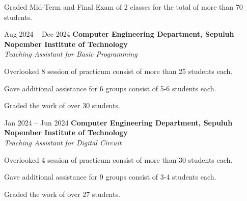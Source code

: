     \vspace{0.10 cm}
    \begin{onecolentry}
        \begin{highlights}
            \item Graded Mid-Term and Final Exam of 2 classes for the total of more than 70 students.
            \end{highlights}
    \end{onecolentry}

    \vspace{0.2 cm}

    \begin{twocolentry}{
        Aug 2024 – Dec 2024
    }
    \textbf{Computer Engineering Department, Sepuluh Nopember Institute of Technology}\\
    \textit{Teaching Assistant for Basic Programming}
    \end{twocolentry}

    \vspace{0.10 cm}
    \begin{onecolentry}
        \begin{highlights}
            \item Overlooked 8 session of practicum consist of more than 25 students each.
            \item Gave additional assistance for 6 groups consist of 5-6 students each.
            \item Graded the work of over 30 students.
        \end{highlights}
    \end{onecolentry}

    \vspace{0.2 cm}

    \begin{twocolentry}{
        Jan 2024 – Jun 2024
    }
    \textbf{Computer Engineering Department, Sepuluh Nopember Institute of Technology}\\
    \textit{Teaching Assistant for Digital Circuit}
    \end{twocolentry}

    \vspace{0.10 cm}
    \begin{onecolentry}
        \begin{highlights}
            \item Overlooked 4 session of practicum consist of more than 30 students each.
            \item Gave additional assistance for 9 groups consist of 3-4 students each.
            \item Graded the work of over 27 students.
        \end{highlights}
    \end{onecolentry}

